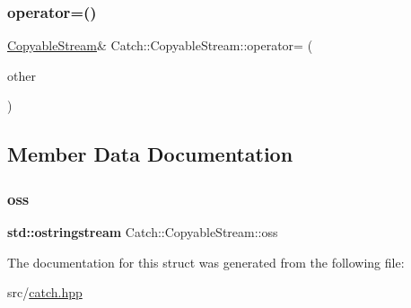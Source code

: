 \subsubsection{\texorpdfstring{operator=()}{operator=()}}
{\footnotesize\ttfamily \hyperlink{struct_catch_1_1_copyable_stream}{Copyable\+Stream}\& Catch\+::\+Copyable\+Stream\+::operator= (\begin{DoxyParamCaption}\item[{\hyperlink{struct_catch_1_1_copyable_stream}{Copyable\+Stream} const \&}]{other }\end{DoxyParamCaption})\hspace{0.3cm}{\ttfamily [inline]}}



\subsection{Member Data Documentation}
\mbox{\label{struct_catch_1_1_copyable_stream_ae123fb4d673e7d7a13a3c5f6bc5d426c}} 
\subsubsection{\texorpdfstring{oss}{oss}}
{\footnotesize\ttfamily \textbf{ std\+::ostringstream} Catch\+::\+Copyable\+Stream\+::oss}



The documentation for this struct was generated from the following file\+:\begin{DoxyCompactItemize}
\item 
src/\hyperlink{catch_8hpp}{catch.\+hpp}\end{DoxyCompactItemize}
